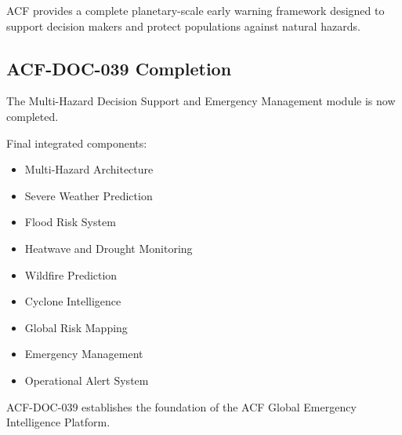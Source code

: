 ACF provides a complete planetary-scale early warning framework
designed to support decision makers and protect populations against
natural hazards.



\subsection{ACF-DOC-039 Completion}

The Multi-Hazard Decision Support and Emergency Management module is now
completed.

Final integrated components:

\begin{itemize}

\item Multi-Hazard Architecture

\item Severe Weather Prediction

\item Flood Risk System

\item Heatwave and Drought Monitoring

\item Wildfire Prediction

\item Cyclone Intelligence

\item Global Risk Mapping

\item Emergency Management

\item Operational Alert System

\end{itemize}


ACF-DOC-039 establishes the foundation of the ACF Global Emergency
Intelligence Platform.



